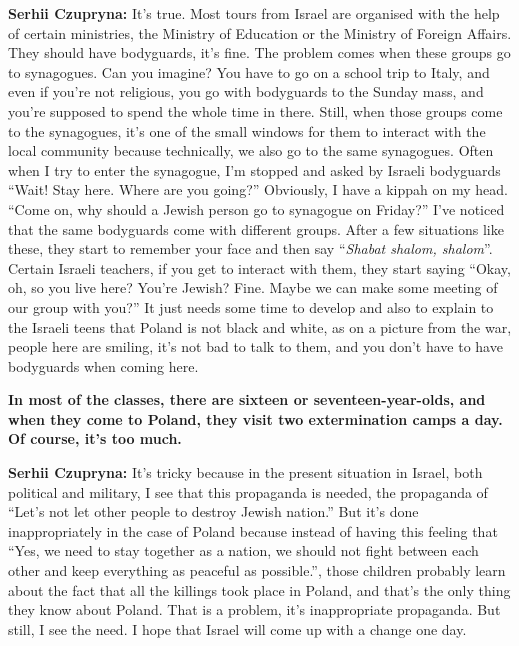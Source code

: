 \textbf{Serhii Czupryna:} It’s true. Most tours from Israel are organised with the help of certain ministries, the Ministry of Education or the Ministry of Foreign Affairs. They should have bodyguards, it’s fine. The problem comes when these groups go to synagogues. Can you imagine? You have to go on a school trip to Italy, and even if you’re not religious, you go with bodyguards to the Sunday mass, and you’re supposed to spend the whole time in there. Still, when those groups come to the synagogues, it’s one of the small windows for them to interact with the local community because technically, we also go to the same synagogues. Often when I try to enter the synagogue, I’m stopped and asked by Israeli bodyguards ``Wait! Stay here. Where are you going?'' Obviously, I have a kippah on my head. ``Come on, why should a Jewish person go to synagogue on Friday?'' I’ve noticed that the same bodyguards come with different groups. After a few situations like these, they start to remember your face and then say ``\textit{Shabat shalom, shalom}''. Certain Israeli teachers, if you get to interact with them, they start saying ``Okay, oh, so you live here? You’re Jewish? Fine. Maybe we can make some meeting of our group with you?'' It just needs some time to develop and also to explain to the Israeli teens that Poland is not black and white, as on a picture from the war, people here are smiling, it’s not bad to talk to them, and you don’t have to have bodyguards when coming here.\par
\textbf{In most of the classes, there are sixteen or seventeen-year-olds, and when they come to Poland, they visit two extermination camps a day. Of course, it’s too much.}\par  
\textbf{Serhii Czupryna:} It’s tricky because in the present situation in Israel, both political and military, I see that this propaganda is needed, the propaganda of ``Let’s not let other people to destroy Jewish nation.'' But it’s done inappropriately in the case of Poland because instead of having this feeling that ``Yes, we need to stay together as a nation, we should not fight between each other and keep everything as peaceful as possible.'', those children probably learn about the fact that all the killings took place in Poland, and that’s the only thing they know about Poland. That is a problem, it’s inappropriate propaganda. But still, I see the need. I hope that Israel will come up with a change one day. \par 
